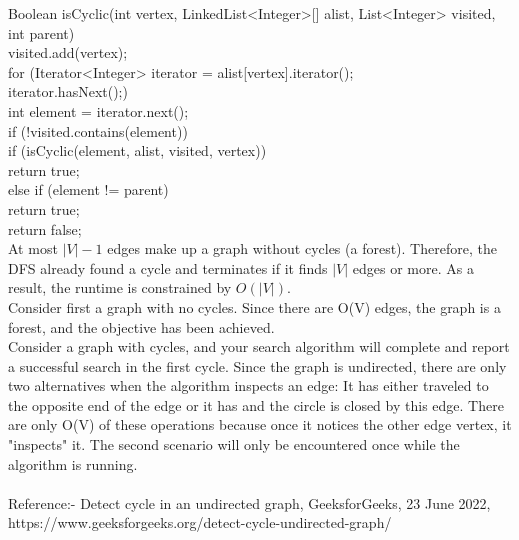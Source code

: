 \documentclass[margin=3mm]{article}
\begin{document}
\begin{enumerate}
Boolean isCyclic(int vertex, LinkedList<Integer>[] alist, List<Integer> visited, int parent) \\
    visited.add(vertex);\\
    for (Iterator<Integer> iterator = alist[vertex].iterator();\\ iterator.hasNext();) \\
        int element = iterator.next();\\
        if (!visited.contains(element)) \\
            if (isCyclic(element, alist, visited, vertex))\\
                return true;\\
        else if (element != parent)\\
            return true;\\
    return false;\\

At most $|V| - 1$ edges make up a graph without cycles (a forest). Therefore, the DFS already found a cycle and terminates if it finds $|V|$ edges or more. As a result, the runtime is constrained by $O(|V|)$. \\
Consider first a graph with no cycles. Since there are O(V) edges, the graph is a forest, and the objective has been achieved. \\
Consider a graph with cycles, and your search algorithm will complete and report a successful search in the first cycle. Since the graph is undirected, there are only two alternatives when the algorithm inspects an edge: It has either traveled to the opposite end of the edge or it has and the circle is closed by this edge. There are only O(V) of these operations because once it notices the other edge vertex, it "inspects" it. The second scenario will only be encountered once while the algorithm is running.\\

\\Reference:- Detect cycle in an undirected graph, GeeksforGeeks, 23 June 2022, https://www.geeksforgeeks.org/detect-cycle-undirected-graph/\\

\end{enumerate}
\end{document}
